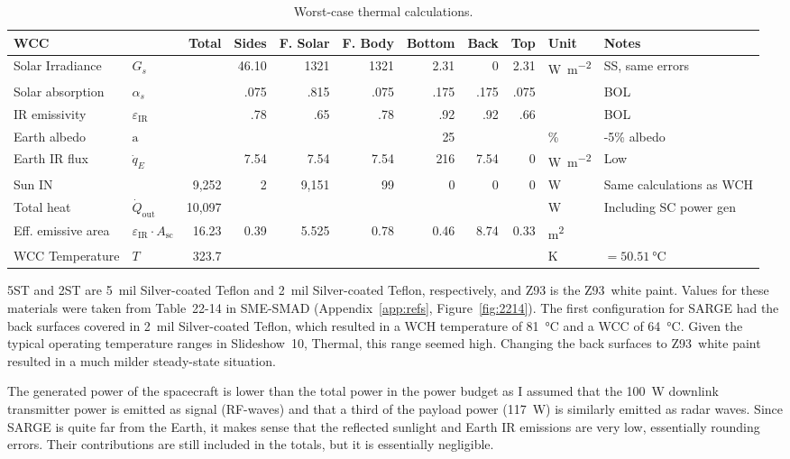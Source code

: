 \documentclass[9pt]{article}
\begin{document}
\begin{landscape}
\begin{table}[h]
\begin{tabularx}{1.00\linewidth}{ll|r|rrrrrr|l|X}
      \bottomrule\toprule
      WCC & & Total & Sides & F. Solar & F. Body & Bottom & Back & Top & Unit & Notes \\
      \midrule
      Solar Irradiance & $G_s$ & & 46.10 & 1321 & 1321 & 2.31 & 0 & 2.31 & \si{\watt\per\meter\squared} & SS, same errors\\
      Solar absorption & $\alpha_s$ & & .075 & .815 & .075 & .175 & .175 & .075 & & BOL\\
      IR emissivity & $\varepsilon_\text{IR}$ & & .78 & .65 & .78 & .92 & .92 & .66 & & BOL\\
      Earth albedo & $\mathrm{a}$ & & & &  & 25 & & & \si{\percent} & -5\% albedo\\
      Earth IR flux & $\dot q_E$ & & 7.54 & 7.54 & 7.54 & 216 & 7.54 & 0 & \si{\watt\per\meter\squared} & Low\\
      \midrule
      Sun IN & & 9,252 & 2 & 9,151 & 99 & 0 & 0 & 0 &\si{\watt} & Same calculations as WCH\\
      Total heat & $\dot Q_\text{out}$ & 10,097 & & & &  & & & \si{\watt} & Including SC power gen\\
      \midrule
      Eff. emissive area & $\varepsilon_\text{IR}\cdot A_\text{sc}$&16.23 & 0.39 & 5.525 & 0.78 & 0.46 & 8.74 & 0.33 & \si{\meter\squared}&\\
      WCC Temperature & $T$ & 323.7 & & & & & & & \si{\kelvin} & $=\qty{50.51}{\celsius}$\\
      \bottomrule
    \end{tabularx}
    \caption{Worst-case thermal calculations.}
    \label{tab:thermal}
  \end{table}
\end{landscape}
5ST and 2ST are 5~mil Silver-coated Teflon and 2~mil Silver-coated Teflon, respectively, and Z93 is the Z93~white paint.
Values for these materials were taken from Table~22-14 in SME-SMAD (Appendix~\ref{app:refs}, Figure~\ref{fig:2214}).
The first configuration for SARGE had the back surfaces covered in 2~mil Silver-coated Teflon, which resulted in a WCH temperature of \qty{81}{\celsius} and a WCC of \qty{64}{\celsius}.
Given the typical operating temperature ranges in Slideshow~10, Thermal, this range seemed high.
Changing the back surfaces to Z93~white paint resulted in a much milder steady-state situation.

The generated power of the spacecraft is lower than the total power in the power budget as I assumed that the \qty{100}{\watt} downlink transmitter power is emitted as signal (RF-waves) and that a third of the payload power (\qty{117}{\watt}) is similarly emitted as radar waves.
Since SARGE is quite far from the Earth, it makes sense that the reflected sunlight and Earth IR emissions are very low, essentially rounding errors. Their contributions are still included in the totals, but it is essentially negligible.
\end{document}

